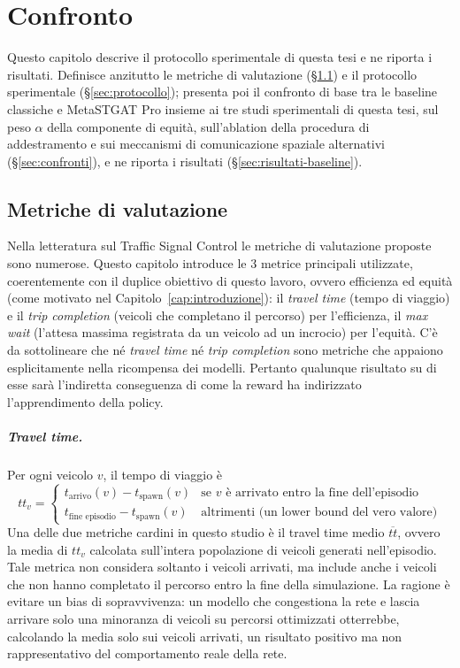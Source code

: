 \chapter{Confronto}
\label{cap:confronto}

Questo capitolo descrive il protocollo sperimentale di questa tesi e ne
riporta i risultati. Definisce anzitutto le metriche di valutazione
(§\ref{sec:metriche}) e il protocollo sperimentale
(§\ref{sec:protocollo}); presenta poi il confronto di base tra le
baseline classiche e MetaSTGAT Pro insieme ai tre studi sperimentali di
questa tesi, sul peso $\alpha$ della componente di equità, sull'ablation
della procedura di addestramento e sui meccanismi di comunicazione
spaziale alternativi (§\ref{sec:confronti}), e ne riporta i risultati
(§\ref{sec:risultati-baseline}).

\section{Metriche di valutazione}
\label{sec:metriche}

Nella letteratura sul Traffic Signal Control le metriche di valutazione
proposte sono numerose.
Questo capitolo introduce le 3 metrice principali utilizzate, coerentemente con il duplice obiettivo di
questo lavoro, ovvero efficienza ed equità (come motivato nel Capitolo~\ref{cap:introduzione}):
il \emph{travel time} (tempo di viaggio) e il \emph{trip completion} (veicoli che
completano il percorso) per l'efficienza, il \emph{max wait} (l'attesa
massima registrata da un veicolo ad un incrocio) per l'equità.
C'è da sottolineare che né \emph{travel time} né
\emph{trip completion} sono metriche che appaiono esplicitamente nella
ricompensa dei modelli. Pertanto qualunque risultato su di esse sarà
l'indiretta conseguenza di come la reward ha indirizzato l'apprendimento
della policy.

\paragraph{Travel time.} Per ogni veicolo $v$, il tempo di viaggio è
\begin{equation}
  tt_v =
  \begin{cases}
    t_{\text{arrivo}}(v) - t_{\text{spawn}}(v)     & \text{se } v \text{ è arrivato entro la fine dell'episodio} \\
    t_{\text{fine episodio}} - t_{\text{spawn}}(v) & \text{altrimenti (un lower bound del vero valore)}
  \end{cases}
\end{equation}
Una delle due metriche cardini in questo studio è il travel time medio $\overline{tt}$,
ovvero la media di $ tt_v $ calcolata sull'intera popolazione di veicoli generati nell'episodio.
Tale metrica non considera soltanto i veicoli arrivati, ma include anche i
veicoli che non hanno completato il percorso entro la fine della simulazione.
La ragione è evitare un bias di sopravvivenza: un
modello che congestiona la rete e lascia arrivare solo una minoranza di
veicoli su percorsi ottimizzati otterrebbe, calcolando la media solo sui
veicoli arrivati, un risultato positivo ma non rappresentativo del comportamento reale della rete.


